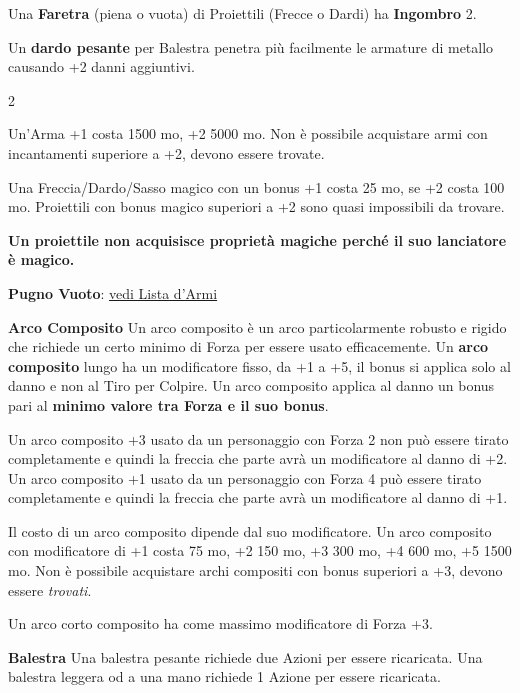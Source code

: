 \medskip

Una \textbf{Faretra} (piena o vuota) di Proiettili (Frecce o Dardi) ha \textbf{Ingombro} 2.

Un \textbf{dardo pesante} per Balestra penetra più facilmente le armature di metallo causando +2 danni aggiuntivi.

\begin{multicols}{2}

Un'Arma +1 costa 1500 mo, +2 5000 mo. Non è possibile acquistare armi con incantamenti superiore a +2, devono essere trovate.

Una Freccia/Dardo/Sasso magico con un bonus +1 costa 25 mo, se +2 costa 100 mo. Proiettili con bonus magico superiori a +2 sono quasi impossibili da trovare.

\textbf{Un proiettile non acquisisce proprietà magiche perché il suo lanciatore è magico.}

\medskip

\textbf{Pugno Vuoto}: \hyperlink{pugnovuoto}{vedi Lista d'Armi}

\medskip

\textbf{Arco Composito}
Un arco composito è un arco particolarmente robusto e rigido che richiede un certo minimo di Forza per essere usato efficacemente.
Un \textbf{arco composito} lungo ha un modificatore fisso, da +1 a +5, il bonus si applica solo al danno e non al Tiro per Colpire. Un arco composito applica al danno un bonus pari al \textbf{minimo valore tra Forza e il suo bonus}.

Un arco composito +3 usato da un personaggio con Forza 2 non può essere tirato completamente e quindi la freccia che parte avrà un modificatore al danno di +2.
Un arco composito +1 usato da un personaggio con Forza 4 può essere tirato completamente e quindi la freccia che parte avrà un modificatore al danno di +1.

Il costo di un arco composito dipende dal suo modificatore.
Un arco composito con modificatore di +1 costa 75 mo, +2 150 mo, +3 300 mo, +4 600 mo, +5 1500 mo. Non è possibile acquistare archi compositi con bonus superiori a +3, devono essere \emph{trovati}.

Un arco corto composito ha come massimo modificatore di Forza +3.

\textbf{Balestra}
Una balestra pesante richiede due Azioni per essere ricaricata. Una balestra leggera od a una mano richiede 1 Azione per essere ricaricata.


\end{multicols}
